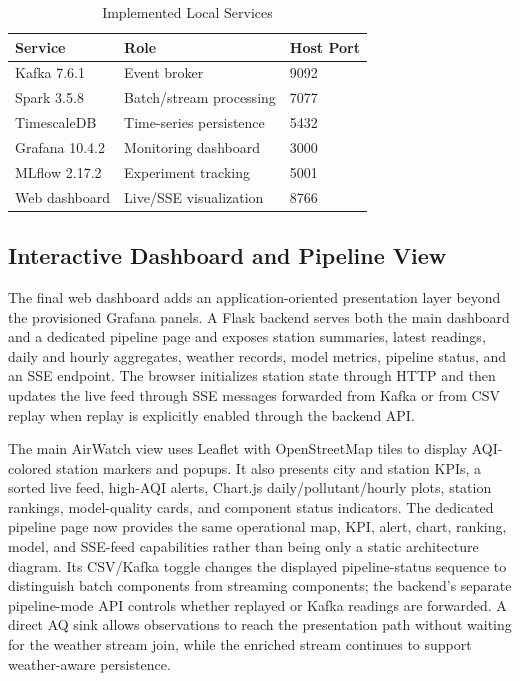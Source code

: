 \documentclass[conference]{IEEEtran}
\begin{document}
\begin{table}[t]
\caption{Implemented Local Services}
\label{tab:services}
\centering
\begin{tabular}{lll}
\toprule
\textbf{Service} & \textbf{Role} & \textbf{Host Port}\\
\midrule
Kafka 7.6.1 & Event broker & 9092\\
Spark 3.5.8 & Batch/stream processing & 7077\\
TimescaleDB & Time-series persistence & 5432\\
Grafana 10.4.2 & Monitoring dashboard & 3000\\
MLflow 2.17.2 & Experiment tracking & 5001\\
Web dashboard & Live/SSE visualization & 8766\\
\bottomrule
\end{tabular}
\end{table}

\subsection{Interactive Dashboard and Pipeline View}
The final web dashboard adds an application-oriented presentation layer beyond
the provisioned Grafana panels. A Flask backend serves both the main dashboard
and a dedicated pipeline page and exposes station summaries, latest readings,
daily and hourly aggregates, weather records, model metrics, pipeline status,
and an SSE endpoint. The browser initializes station state through HTTP and
then updates the live feed through SSE messages forwarded from Kafka or from
CSV replay when replay is explicitly enabled through the backend API.

The main AirWatch view uses Leaflet with OpenStreetMap tiles to display
AQI-colored station markers and popups. It also presents city and station
KPIs, a sorted live feed, high-AQI alerts, Chart.js daily/pollutant/hourly
plots, station rankings, model-quality cards, and component status indicators.
The dedicated pipeline page now provides the same operational map, KPI, alert,
chart, ranking, model, and SSE-feed capabilities rather than being only a
static architecture diagram. Its CSV/Kafka toggle changes the displayed
pipeline-status sequence to distinguish batch components from streaming
components; the backend's separate pipeline-mode API controls whether replayed
or Kafka readings are forwarded. A direct AQ sink allows observations to reach
the presentation path without waiting for the weather stream join, while the
enriched stream continues to support weather-aware persistence.
\end{document}
